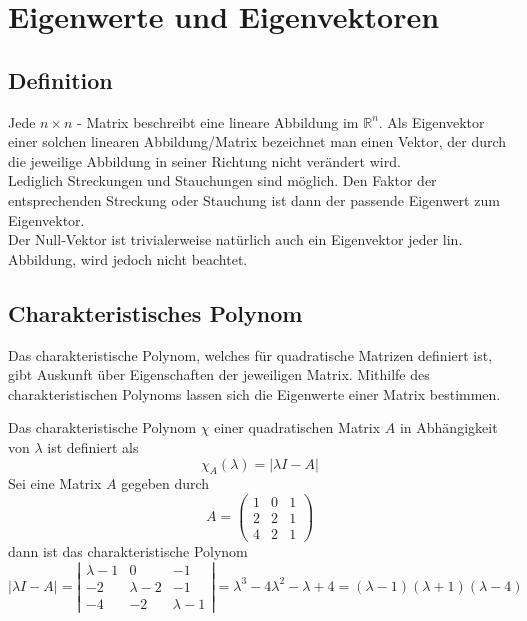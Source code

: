 
\section{Eigenwerte und Eigenvektoren}
\label{sec:eigenwerte_und_eigenvektoren}

\subsection{Definition}
\label{sub:definition}
Jede $n \times n$ - Matrix beschreibt eine lineare Abbildung im $\mathbb{R}^n$.
Als Eigenvektor einer solchen linearen Abbildung/Matrix bezeichnet man einen Vektor, der durch die jeweilige 
Abbildung in seiner Richtung nicht verändert wird.\\
Lediglich Streckungen und Stauchungen sind möglich. Den Faktor der entsprechenden 
Streckung oder Stauchung ist dann der passende Eigenwert zum Eigenvektor.\\
Der Null-Vektor ist trivialerweise natürlich auch ein Eigenvektor jeder lin. Abbildung, wird jedoch nicht beachtet.

\subsection{Charakteristisches Polynom}
\label{sub:charakteristisches_polynom}

Das charakteristische Polynom, welches für quadratische Matrizen definiert ist, gibt Auskunft über Eigenschaften
der jeweiligen Matrix. Mithilfe des charakteristischen Polynoms lassen sich die Eigenwerte einer Matrix bestimmen.

Das charakteristische Polynom $\chi$ einer quadratischen Matrix $A$ in Abhängigkeit von $\lambda$ 
ist definiert als 
\begin{equation}
	\chi_A(\lambda) = |\lambda I-A|
\end{equation}
Sei eine Matrix $A$ gegeben durch
\begin{displaymath}
	A = \left( \begin{matrix}1 & 0 & 1 \\ 2 & 2 & 1 \\ 4 & 2 & 1 \end{matrix} \right)
\end{displaymath}
dann ist das charakteristische Polynom
\begin{displaymath}
	|\lambda I-A| 
	= \left| \begin{matrix}\lambda-1 & 0 & -1 \\ -2 & \lambda-2 & -1 \\ -4 & -2 & \lambda-1 \end{matrix} \right|
	= \lambda^3 - 4 \lambda^2 - \lambda + 4 = (\lambda - 1)(\lambda + 1)(\lambda - 4)
\end{displaymath}

